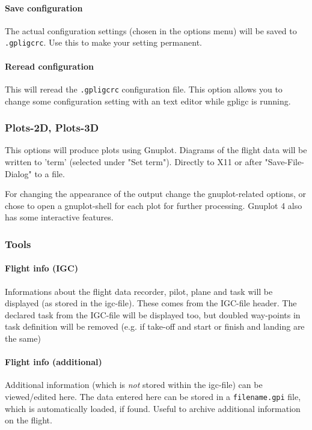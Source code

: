 \paragraph{Save configuration}
The actual configuration settings (chosen in the options menu) will be saved to \texttt{.gpligcrc}.
Use this to make your setting permanent.

\paragraph{Reread configuration}
This will reread the \texttt{.gpligcrc} configuration file.
This option allows you to change some configuration setting with an text editor while gpligc is running.


\subsubsection{Plots-2D, Plots-3D}
This options will produce plots using Gnuplot.
Diagrams of the flight data will be written to 'term' (selected under "Set term").
Directly to X11 or after "Save-File-Dialog" to a file.

For changing the appearance of the output change the gnuplot-related options, or chose to open
a gnuplot-shell for each plot for further processing.
Gnuplot 4 also has some interactive features.

\subsubsection{Tools}

\paragraph{Flight info (IGC)}
Informations about the flight data recorder, pilot, plane and task will be displayed (as stored in the igc-file).
These comes from the IGC-file header.
The declared task from the IGC-file will be displayed too, but doubled way-points in task definition will be removed
(e.g. if take-off and start or finish and landing are the same)

\paragraph{Flight info (additional)}
\label{add_info}
Additional information (which is \emph{not} stored within the igc-file) can be viewed/edited here.
The data entered here can be stored in a \texttt{filename.gpi} file, which is automatically loaded, if found.
Useful to archive additional information on the flight.


